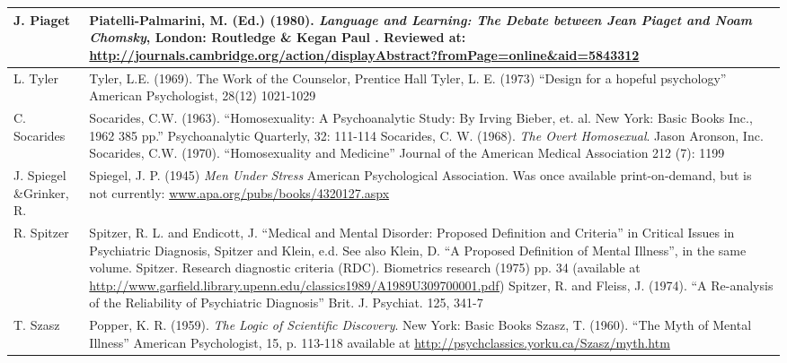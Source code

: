 \begin{refsection}
\begin{longtable}[!t]{ | p{3cm} |  p{12cm} |  }
J. Piaget&Piatelli-Palmarini, M. (Ed.) (1980). \emph{Language and Learning: The Debate between Jean Piaget and Noam Chomsky}, London: Routledge \& Kegan Paul . Reviewed at: \url{http://journals.cambridge.org/action/displayAbstract?fromPage=online&aid=5843312}
\\ \hline
L. Tyler&Tyler, L.E. (1969). The Work of the Counselor, Prentice Hall
\newline
Tyler, L. E. (1973) “Design for a hopeful psychology” American Psychologist, 28(12) 1021-1029
\\ \hline


C. Socarides&Socarides, C.W. (1963). “Homosexuality: A Psychoanalytic Study: By Irving Bieber, et. al. New York: Basic Books Inc., 1962 385 pp.” Psychoanalytic Quarterly, 32: 111-114
\newline
Socarides, C. W. (1968). \emph{The Overt Homosexual}. Jason Aronson, Inc.
\newline
Socarides, C.W. (1970). “Homosexuality and Medicine” Journal of the American Medical Association 212 (7): 1199
 \\ \hline

J. Spiegel \&Grinker, R. & Spiegel, J. P. (1945) \emph{Men Under Stress} American Psychological Association. Was once available print-on-demand, but is not currently: \url{www.apa.org/pubs/books/4320127.aspx}
\\ \hline

R. Spitzer&Spitzer, R. L. and Endicott, J. “Medical and Mental Disorder: Proposed Definition and Criteria” in Critical Issues in Psychiatric Diagnosis, Spitzer and Klein, e.d. See also Klein, D. “A Proposed Definition of Mental Illness”, in the same volume.
\newline
Spitzer. Research diagnostic criteria (RDC). Biometrics research (1975) pp. 34 (available at \url{http://www.garfield.library.upenn.edu/classics1989/A1989U309700001.pdf})
\newline
Spitzer, R. and Fleiss, J. (1974). “A Re-analysis of the Reliability of Psychiatric Diagnosis” Brit. J. Psychiat. 125, 341-7 \\ \hline

T. Szasz& Popper, K. R. (1959). \emph{The Logic of Scientific Discovery}. New York: Basic Books
\newline
Szasz, T. (1960). “The Myth of Mental Illness” American Psychologist, 15, p. 113-118 available at \url{http://psychclassics.yorku.ca/Szasz/myth.htm}
\\ \hline


\end{longtable}
\end{refsection}
